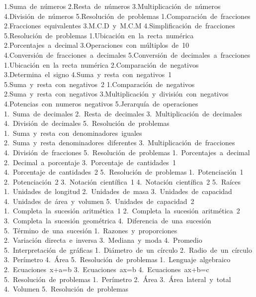 1.Suma~de~números
2.Resta~de~números
3.Multiplicación~de~números
4.División~de~números
5.Resolución~de~problemas
1.Comparación~de~fracciones
2.Fracciones~equivalentes
3.M.C.D~y~M.C.M
4.Simplificación~de~fracciones
5.Resolución~de~problemas
1.Ubicación~en~la~recta~numérica
2.Porcentajes~a~decimal
3.Operaciones~con~múltiplos~de~10
4.Conversión~de~fracciones~a~decimales
5.Conversión~de~decimales~a~fracciones
1.Ubicación~en~la~recta~numérica
2.Comparación~de~negativos
3.Determina~el~signo
4.Suma~y~resta~con~negativos~1
5.Suma~y~resta~con~negativos~2
1.Comparación~de~negativos
2.Suma~y~resta~con~negativos
3.Multiplicación~y~división~con~negativos
4.Potencias~con~numeros~negativos
5.Jerarquía~de~operaciones
1.~Suma~de~decimales
2.~Resta~de~decimales
3.~Multiplicación~de~decimales
4.~División~de~decimales
5.~Resolución~de~problemas
1.~Suma~y~resta~con~denominadores~iguales
2.~Suma~y~resta~denominadores~diferentes
3.~Multiplicación~de~fracciones
4.~División~de~fracciones
5.~Resolución~de~problemas
1.~Porcentajes~a~decimal
2.~Decimal~a~porcentaje
3.~Porcentaje~de~cantidades~1
4.~Porcentaje~de~cantidades~2
5.~Resolución~de~problemas
1.~Potenciación~1
2.~Potenciación~2
3.~Notación~científica~1
4.~Notación~científica~2
5.~Raíces
1.~Unidades~de~longitud
2.~Unidades~de~masa
3.~Unidades~de~capacidad
4.~Unidades~de~área~y~volumen
5.~Unidades~de~capacidad~2
1.~Completa~la~sucesión~aritmética~1
2.~Completa~la~sucesión~aritmética~2
3.~Completa~la~sucesión~geométrica
4.~Diferencia~de~una~sucesión
5.~Término~de~una~sucesión
1.~Razones~y~proporciones
2.~Variación~directa~e~inversa
3.~Mediana~y~moda
4.~Promedio
5.~Interpretación~de~gráficas
1.~Diámetro~de~un~círculo
2.~Radio~de~un~círculo
3.~Perímetro
4.~Área
5.~Resolución~de~problemas
1.~Lenguaje~algebraico
2.~Ecuaciones~x+a=b
3.~Ecuaciones~ax=b
4.~Ecuaciones~ax+b=c
5.~Resolución~de~problemas
1.~Perímetro
2.~Área
3.~Área~lateral~y~total
4.~Volumen
5.~Resolución~de~problemas
